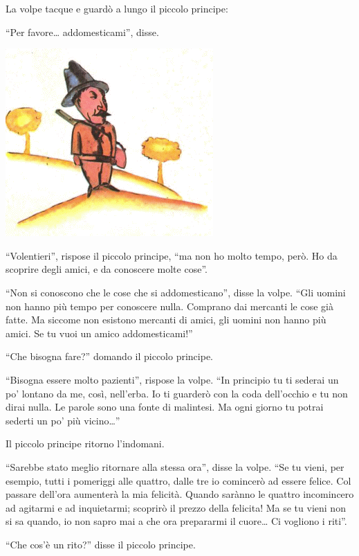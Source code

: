 \documentclass[11pt]{scrbook}
\begin{document}
La volpe tacque e guardò a lungo il piccolo principe:

``Per favore\ldots{} addomesticami'', disse.

\begin{center}
\includegraphics{img/myslivec}
\end{center}

``Volentieri'', rispose il piccolo principe, ``ma non ho molto tempo, però. Ho da scoprire degli amici, e da conoscere molte cose''.

``Non si conoscono che le cose che si addomesticano'', disse la volpe. ``Gli uomini non hanno più tempo per conoscere nulla. Comprano dai mercanti le cose già fatte. Ma siccome non esistono mercanti di amici, gli uomini non hanno più amici. Se tu vuoi un amico addomesticami!''

``Che bisogna fare?'' domando il piccolo principe.

``Bisogna essere molto pazienti'', rispose la volpe. ``In principio tu ti sederai un po' lontano da me, così, nell'erba. Io ti guarderò con la coda dell'occhio e tu non dirai nulla. Le parole sono una fonte di malintesi. Ma ogni giorno tu potrai sederti un po' più vicino\ldots{}''

Il piccolo principe ritorno l'indomani.

``Sarebbe stato meglio ritornare alla stessa ora'', disse la volpe. ``Se tu vieni, per esempio, tutti i pomeriggi alle quattro, dalle tre io comincerò ad essere felice. Col passare dell'ora aumenterà la mia felicità. Quando sarànno le quattro incomincero ad agitarmi e ad inquietarmi; scoprirò il prezzo della felicita! Ma se tu vieni non si sa
quando, io non sapro mai a che ora prepararmi il cuore\ldots{} Ci vogliono i riti''.

``Che cos'è un rito?'' disse il piccolo principe.
\end{document}
